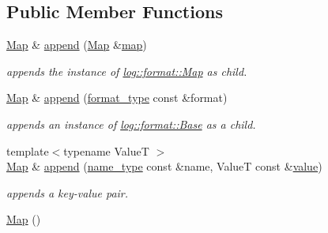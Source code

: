 \subsection*{Public Member Functions}
\begin{DoxyCompactItemize}
\item 
\hyperlink{classhryky_1_1log_1_1format_1_1_map}{Map} \& \hyperlink{classhryky_1_1log_1_1format_1_1_map_a4aa7b22bf43c8d2af7fc15ef0c676af4}{append} (\hyperlink{classhryky_1_1log_1_1format_1_1_map}{Map} \&\hyperlink{classhryky_1_1log_1_1format_1_1_map_afa54cde058f8b7cc18099b6bcdbe6e72}{map})
\begin{DoxyCompactList}\small\item\em appends the instance of \hyperlink{classhryky_1_1log_1_1format_1_1_map}{log\-::format\-::\-Map} as child. \end{DoxyCompactList}\item 
\hyperlink{classhryky_1_1log_1_1format_1_1_map}{Map} \& \hyperlink{classhryky_1_1log_1_1format_1_1_map_aa081847c4ce6c1ad9d7b6ac6435aaaf0}{append} (\hyperlink{namespacehryky_1_1log_ad50448c3f934f1eacd5c1bcffe8111e1}{format\-\_\-type} const \&format)
\begin{DoxyCompactList}\small\item\em appends an instance of \hyperlink{classhryky_1_1log_1_1format_1_1_base}{log\-::format\-::\-Base} as a child. \end{DoxyCompactList}\item 
{\footnotesize template$<$typename Value\-T $>$ }\\\hyperlink{classhryky_1_1log_1_1format_1_1_map}{Map} \& \hyperlink{classhryky_1_1log_1_1format_1_1_map_a61e7546016f71fcb47e9aaa2ac318264}{append} (\hyperlink{namespacehryky_1_1log_1_1format_ab7408d1e2ed2d648dbf9bba69eb74288}{name\-\_\-type} const \&name, Value\-T const \&\hyperlink{namespacehryky_1_1log_1_1format_a5b9af9c1a7b018d54144acfb1b8cc960}{value})
\begin{DoxyCompactList}\small\item\em appends a key-\/value pair. \end{DoxyCompactList}\item 
\hypertarget{classhryky_1_1log_1_1format_1_1_map_ae4eea925dd5bcc042862d6c07eddb037}{\hyperlink{classhryky_1_1log_1_1format_1_1_map_ae4eea925dd5bcc042862d6c07eddb037}{Map} ()}\label{classhryky_1_1log_1_1format_1_1_map_ae4eea925dd5bcc042862d6c07eddb037}


\end{DoxyCompactItemize}

